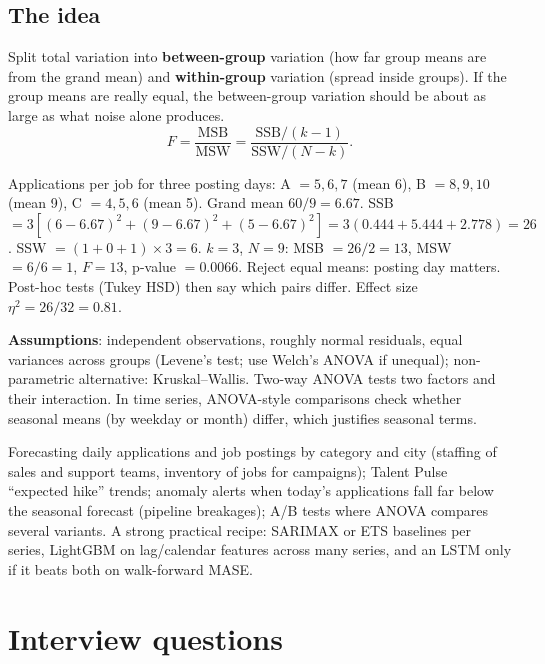 \subsection{The idea}
Split total variation into \textbf{between-group} variation (how far group means are from the grand mean) and \textbf{within-group} variation (spread inside groups).
If the group means are really equal, the between-group variation should be about as large as what noise alone produces.
\[ F = \frac{\text{MSB}}{\text{MSW}} = \frac{\text{SSB}/(k-1)}{\text{SSW}/(N-k)}. \]
\begin{example}
Applications per job for three posting days: A $= 5, 6, 7$ (mean 6), B $= 8, 9, 10$ (mean 9), C $= 4, 5, 6$ (mean 5). Grand mean $60/9 = 6.67$.
SSB $= 3[(6 - 6.67)^2 + (9 - 6.67)^2 + (5 - 6.67)^2] = 3(0.444 + 5.444 + 2.778) = 26$. SSW $= (1 + 0 + 1)\times3 = 6$.
$k = 3$, $N = 9$: MSB $= 26/2 = 13$, MSW $= 6/6 = 1$, $F = 13$, p-value $= 0.0066$. Reject equal means: posting day matters. Post-hoc tests (Tukey HSD) then say which
pairs differ. Effect size $\eta^2 = 26/32 = 0.81$.
\end{example}
\textbf{Assumptions}: independent observations, roughly normal residuals, equal variances across groups (Levene's test; use Welch's ANOVA if unequal); non-parametric
alternative: Kruskal--Wallis. Two-way ANOVA tests two factors and their interaction. In time series, ANOVA-style comparisons check whether seasonal means (by weekday or
month) differ, which justifies seasonal terms.

\begin{practical}
Forecasting daily applications and job postings by category and city (staffing of sales and support teams, inventory of jobs for campaigns); Talent Pulse ``expected
hike'' trends; anomaly alerts when today's applications fall far below the seasonal forecast (pipeline breakages); A/B tests where ANOVA compares several variants.
A strong practical recipe: SARIMAX or ETS baselines per series, LightGBM on lag/calendar features across many series, and an LSTM only if it beats both on walk-forward MASE.
\end{practical}

\section{Interview questions}


